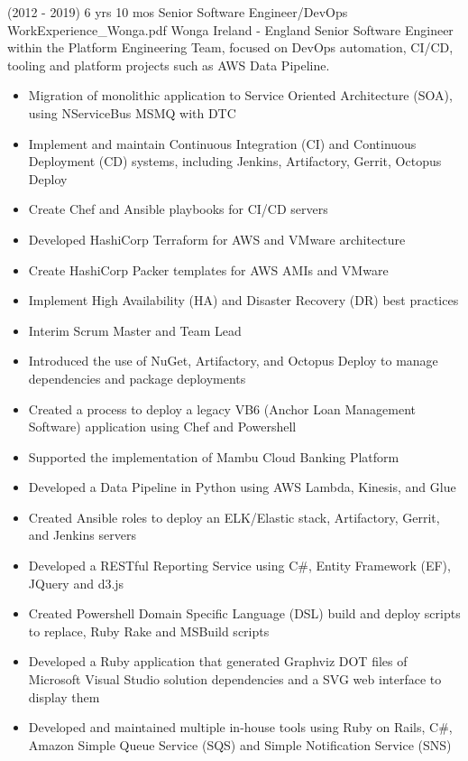 \begin{twenty}
\twentyitem
  {(2012 - 2019) 6 yrs 10 mos}
  {Senior Software Engineer/DevOps}
  {WorkExperience_Wonga.pdf}
  {Wonga}
  {Ireland - England}
  {Senior Software Engineer within the Platform Engineering Team, focused on DevOps automation, CI/CD, tooling and platform projects such as AWS Data Pipeline.}
  {\begin{itemize}
    \item Migration of monolithic application to Service Oriented Architecture (SOA), using NServiceBus MSMQ with DTC
    \item Implement and maintain Continuous Integration (CI) and Continuous Deployment (CD) systems, including Jenkins, Artifactory, Gerrit, Octopus Deploy
    \item Create Chef and Ansible playbooks for CI/CD servers
    \item Developed HashiCorp Terraform for AWS and VMware architecture
    \item Create HashiCorp Packer templates for AWS AMIs and VMware
    \item Implement High Availability (HA) and Disaster Recovery (DR) best practices
    \item Interim Scrum Master and Team Lead
  \end{itemize}}
  {\begin{itemize}
    \item Introduced the use of NuGet, Artifactory, and Octopus Deploy to manage dependencies and package deployments
    \item Created a process to deploy a legacy VB6 (Anchor Loan Management Software) application using Chef and Powershell
    \item Supported the implementation of Mambu Cloud Banking Platform
    \item Developed a Data Pipeline in Python using AWS Lambda, Kinesis, and Glue
    \item Created Ansible roles to deploy an ELK/Elastic stack, Artifactory, Gerrit, and Jenkins servers
    \item Developed a RESTful Reporting Service using C\#, Entity Framework (EF), JQuery and d3.js
    \item Created Powershell Domain Specific Language (DSL) build and deploy scripts to replace, Ruby Rake and MSBuild scripts
    \item Developed a Ruby application that generated Graphviz DOT files of Microsoft Visual Studio solution dependencies and a SVG web interface to display them
    \item Developed and maintained multiple in-house tools using Ruby on Rails, C\#, Amazon Simple Queue Service (SQS) and Simple Notification Service (SNS)
  \end{itemize}}
\end{twenty}

